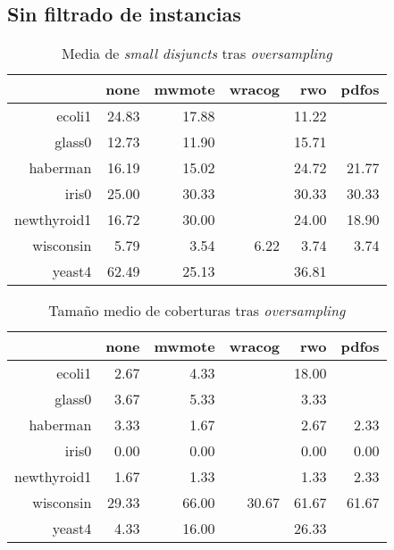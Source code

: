 \subsection{Sin filtrado de instancias}
  \begin{table}[H]
  \centering
  \begin{tabular}{rrrrrr}
    \hline
    & none & mwmote & wracog & rwo & pdfos \\ 
    \hline
    ecoli1 & 24.83 & 17.88 &  & 11.22 &  \\ 
    glass0 & 12.73 & 11.90 &  & 15.71 &  \\ 
    haberman & 16.19 & 15.02 &  & 24.72 & 21.77 \\ 
    iris0 & 25.00 & 30.33 &  & 30.33 & 30.33 \\ 
    newthyroid1 & 16.72 & 30.00 &  & 24.00 & 18.90 \\ 
    wisconsin & 5.79 & 3.54 & 6.22 & 3.74 & 3.74 \\ 
    yeast4 & 62.49 & 25.13 &  & 36.81 &  \\ 
    \hline
  \end{tabular}
  \caption{Media de \textit{small disjuncts} tras \textit{oversampling}}
  \end{table}

  \begin{table}[H]
  \centering
  \begin{tabular}{rrrrrr}
    \hline
    & none & mwmote & wracog & rwo & pdfos \\ 
    \hline
    ecoli1 & 2.67 & 4.33 &  & 18.00 &  \\ 
    glass0 & 3.67 & 5.33 &  & 3.33 &  \\ 
    haberman & 3.33 & 1.67 &  & 2.67 & 2.33 \\ 
    iris0 & 0.00 & 0.00 &  & 0.00 & 0.00 \\ 
    newthyroid1 & 1.67 & 1.33 &  & 1.33 & 2.33 \\ 
    wisconsin & 29.33 & 66.00 & 30.67 & 61.67 & 61.67 \\ 
    yeast4 & 4.33 & 16.00 &  & 26.33 &  \\ 
    \hline
  \end{tabular}
  \caption{Tamaño medio de coberturas tras \textit{oversampling}}
  \end{table}
  

